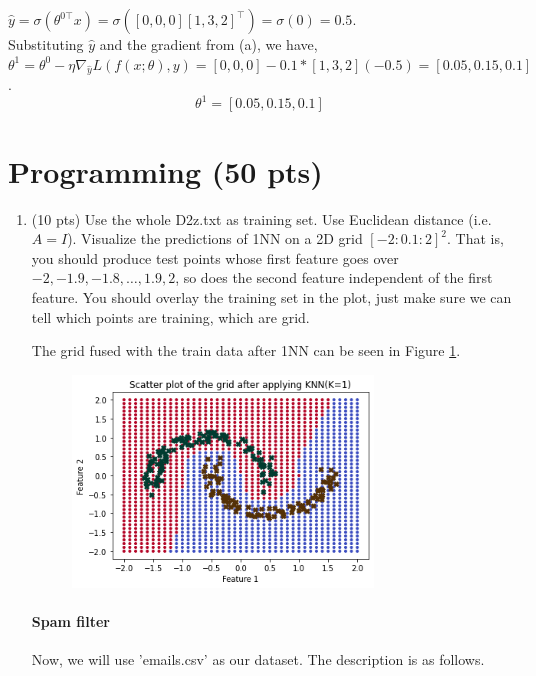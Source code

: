 \documentclass[a4paper]{article}
\theoremstyle{definition}
\newenvironment{soln}{
    \leavevmode\color{blue}\ignorespaces
}{}
\begin{document}
\begin{enumerate}
\begin{enumerate}
	\begin{soln}  $\hat{y}=\sigma(\theta^{0\top} x)=\sigma([0,0,0] [1,3,2]^\top)=\sigma(0)=0.5$.\\
    Substituting $\hat{y}$ and the gradient from (a), we have, $\theta^1=\theta^0 - \eta \nabla_{\hat{y}} L(f(x;\theta), y)=[0,0,0]-0.1*[1,3,2](-0.5)=[0.05,0.15,0.1]$.
    $$\theta^1=[0.05,0.15,0.1]$$
 \end{soln}
\end{enumerate}
\end{enumerate}

\section{Programming (50 pts)}
\begin{enumerate}
	\item (10 pts) Use the whole D2z.txt as training set.  Use Euclidean distance (i.e. $A=I$).
	Visualize the predictions of 1NN on a 2D grid $[-2:0.1:2]^2$.
	That is, you should produce test points whose first feature goes over $-2, -1.9, -1.8, \ldots, 1.9, 2$, so does the second feature independent of the first feature.
	You should overlay the training set in the plot, just make sure we can tell which points are training, which are grid.
	\begin{soln}
    The grid fused with the train data after 1NN can be seen in Figure \ref{fig:q2_1}.
	  \begin{figure}[hbt!]
		\centering
		\includegraphics[width=8cm]{images/q2_1_grid.png}
        \caption{} \label{fig:q2_1}
	\end{figure}  
	\end{soln}
	
	
	\paragraph{Spam filter} Now, we will use 'emails.csv' as our dataset. The description is as follows.


\end{enumerate}
\end{document}
